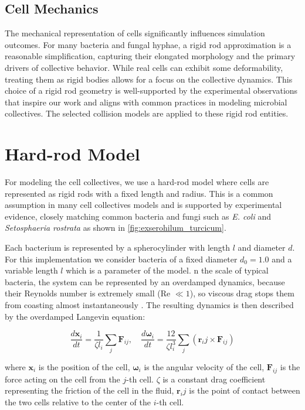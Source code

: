 \documentclass[conference]{IEEEtran}
\begin{document}
\subsection{Cell Mechanics}

The mechanical representation of cells significantly influences simulation outcomes. For many bacteria and fungal hyphae, a rigid rod approximation is a reasonable simplification, capturing their elongated morphology and the primary drivers of collective behavior. While real cells can exhibit some deformability, treating them as rigid bodies allows for a focus on the collective dynamics. This choice of a rigid rod geometry is well-supported by the experimental observations that inspire our work and aligns with common practices in modeling microbial collectives\cite{You2018}\cite{Weady2024}\cite{Blanchard2015}\cite{Warren2019}\cite{Ghosh2015}. The selected collision models are applied to these rigid rod entities.

\section{Hard-rod Model}

For modeling the cell collectives, we use a hard-rod model where cells are represented as rigid rods with a fixed length and radius. This is a common assumption in many cell collectives models \cite{You2018}\cite{Weady2024}\cite{Blanchard2015}\cite{Warren2019}\cite{Ghosh2015} and is supported by experimental evidence, closely matching common bacteria and fungi such as \textit{E. coli} and \textit{Setosphaeria rostrata} as shown in \autoref{fig:exserohilum_turcicum}.


Each bacterium is represented by a spherocylinder with length $l$ and diameter $d$. For this implementation we consider bacteria of a fixed diameter $d_0 = 1.0$ and a variable length $l$ which is a parameter of the model. n the scale of typical bacteria, the system can be represented by an overdamped dynamics, because their Reynolds number is extremely small (Re $\ll 1$), so viscous drag stops them from coasting almost instantaneously \cite{datta2024lifelowreynoldsnumber}. The resulting dynamics is then described by the overdamped Langevin equation:

$$
    \frac{d \mathbf{x}_i}{dt} = \frac{1}{\zeta l_i} \sum_j \mathbf{F}_{ij}, \quad \frac{d \mathbf{\omega}_i}{dt} = \frac{12}{\zeta l_i^3} \sum_j (\mathbf{r}_ij \times \mathbf{F}_{ij})
$$
\label{eq:overdamped_langevin}

where $\mathbf{x}_i$ is the position of the cell, $\mathbf{\omega}_i$ is the angular velocity of the cell, $\mathbf{F}_{ij}$ is the force acting on the cell from the $j$-th cell. $\zeta$ is a constant drag coefficient representing the friction of the cell in the fluid, $\mathbf{r}_ij$ is the point of contact between the two cells relative to the center of the $i$-th cell.
\end{document}
